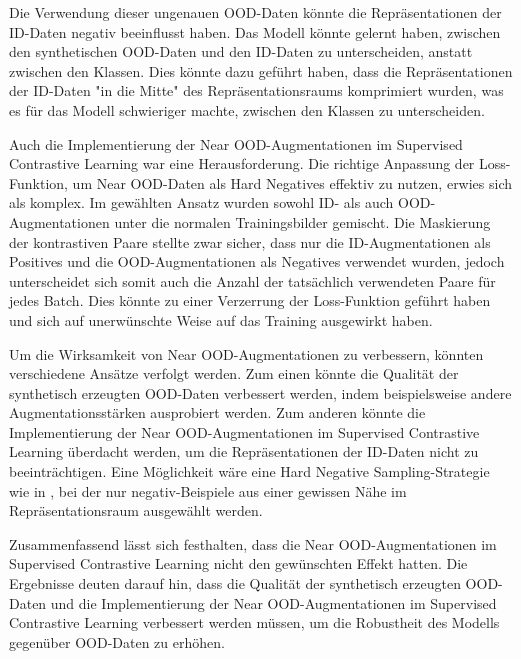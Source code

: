 Die Verwendung dieser ungenauen OOD-Daten könnte die Repräsentationen der ID-Daten negativ beeinflusst haben. Das Modell könnte gelernt haben, zwischen den synthetischen OOD-Daten und den ID-Daten zu unterscheiden, anstatt zwischen den Klassen. Dies könnte dazu geführt haben, dass die Repräsentationen der ID-Daten "in die Mitte" des Repräsentationsraums komprimiert wurden, was es für das Modell schwieriger machte, zwischen den Klassen zu unterscheiden.

Auch die Implementierung der Near OOD-Augmentationen im Supervised Contrastive Learning war eine Herausforderung. Die richtige Anpassung der Loss-Funktion, um Near OOD-Daten als Hard Negatives effektiv zu nutzen, erwies sich als komplex. Im gewählten Ansatz wurden sowohl ID- als auch OOD-Augmentationen unter die normalen Trainingsbilder gemischt. Die Maskierung der kontrastiven Paare stellte zwar sicher, dass nur die ID-Augmentationen als Positives und die OOD-Augmentationen als Negatives verwendet wurden, jedoch unterscheidet sich somit auch die Anzahl der tatsächlich verwendeten Paare für jedes Batch. Dies könnte zu einer Verzerrung der Loss-Funktion geführt haben und sich auf unerwünschte Weise auf das Training ausgewirkt haben.

Um die Wirksamkeit von Near OOD-Augmentationen zu verbessern, könnten verschiedene Ansätze verfolgt werden. Zum einen könnte die Qualität der synthetisch erzeugten OOD-Daten verbessert werden, indem beispielsweise andere Augmentationsstärken ausprobiert werden. Zum anderen könnte die Implementierung der Near OOD-Augmentationen im Supervised Contrastive Learning überdacht werden, um die Repräsentationen der ID-Daten nicht zu beeinträchtigen. Eine Möglichkeit wäre eine Hard Negative Sampling-Strategie wie in \parencite{Jiang2024supconhardnegatives}, bei der nur negativ-Beispiele aus einer gewissen Nähe im Repräsentationsraum ausgewählt werden.

Zusammenfassend lässt sich festhalten, dass die Near OOD-Augmentationen im Supervised Contrastive Learning nicht den gewünschten Effekt hatten. Die Ergebnisse deuten darauf hin, dass die Qualität der synthetisch erzeugten OOD-Daten und die Implementierung der Near OOD-Augmentationen im Supervised Contrastive Learning verbessert werden müssen, um die Robustheit des Modells gegenüber OOD-Daten zu erhöhen.